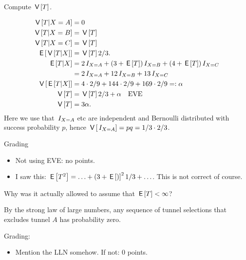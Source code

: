 \begin{exercise}[2]
Compute $\,\mathsf{V}\left[T\right]$.
\begin{solution}
  \begin{align}
\,\mathsf{V}\left[T|X=A\right] &= 0\\
\,\mathsf{V}\left[T|X=B\right] &= \,\mathsf{V}\left[T\right]\\
\,\mathsf{V}\left[T|X=C\right] &= \,\mathsf{V}\left[T\right]\\
\,\mathsf{E}\left[\,\mathsf{V}\left[T|X\right]\right] &= \,\mathsf{V}\left[T\right] 2/ 3.\\
\,\mathsf{E}\left[T|X\right] &= 2 \,I_{X=A} + (3 + \,\mathsf{E}\left[T\right]) \,I_{X=B} + (4 + \,\mathsf{E}\left[T\right])\,I_{X=C} \\
 &= 2 \,I_{X=A} + 12 \,I_{X=B} + 13\,I_{X=C} \\
\,\mathsf{V}\left[\,\mathsf{E}\left[T|X\right]\right] &= 4\cdot 2/9  + 144\cdot 2/9 + 169\cdot 2/9 =: \alpha\\
\,\mathsf{V}\left[T\right] &= \,\mathsf{V}\left[T\right] 2/3 + \alpha  \quad \text{EVE}\\
\,\mathsf{V}\left[T\right] &= 3 \alpha.
  \end{align}
Here we use that $\,I_{X=A}$ etc are independent and Bernoulli distributed with success probability $p$, hence  $\,\mathsf{V}\left[\,I_{X=A}\right]= p q = 1/3\cdot 2/3$.

Grading
\begin{itemize}
\item Not using EVE: no points.
\item I saw this: $\,\mathsf{E}\left[T^{2}\right] = \ldots + (3 + \,\mathsf{E}\left[)\right]^{2} 1/3 + \ldots$. This is not correct of course.
\end{itemize}
\end{solution}
\end{exercise}

\begin{exercise}[1]
Why was it actually allowed to assume that $\,\mathsf{E}\left[T\right] <\infty$?
\begin{solution}
By the strong law of large numbers, any sequence of tunnel selections that excludes tunnel $A$ has probability zero.

Grading:
\begin{itemize}
\item Mention the LLN somehow. If not: 0 points.
\end{itemize}
\end{solution}
\end{exercise}
